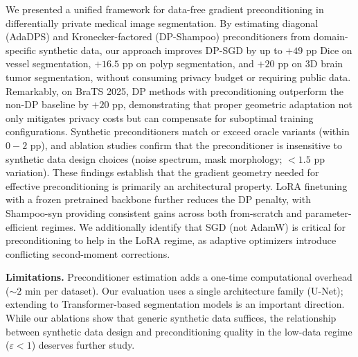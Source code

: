 \documentclass[runningheads]{llncs}
\begin{document}
We presented a unified framework for data-free gradient preconditioning in differentially private medical image segmentation. By estimating diagonal (AdaDPS) and Kronecker-factored (DP-Shampoo) preconditioners from domain-specific synthetic data, our approach improves DP-SGD by up to $+49$ pp Dice on vessel segmentation, $+16.5$ pp on polyp segmentation, and $+20$ pp on 3D brain tumor segmentation, without consuming privacy budget or requiring public data. Remarkably, on BraTS 2025, DP methods with preconditioning outperform the non-DP baseline by $+20$ pp, demonstrating that proper geometric adaptation not only mitigates privacy costs but can compensate for suboptimal training configurations. Synthetic preconditioners match or exceed oracle variants (within $0{-}2$ pp), and ablation studies confirm that the preconditioner is insensitive to synthetic data design choices (noise spectrum, mask morphology; $<1.5$ pp variation). These findings establish that the gradient geometry needed for effective preconditioning is primarily an architectural property. LoRA finetuning with a frozen pretrained backbone further reduces the DP penalty, with Shampoo-syn providing consistent gains across both from-scratch and parameter-efficient regimes. We additionally identify that SGD (not AdamW) is critical for preconditioning to help in the LoRA regime, as adaptive optimizers introduce conflicting second-moment corrections.

\textbf{Limitations.} Preconditioner estimation adds a one-time computational overhead (${\sim}2$ min per dataset). Our evaluation uses a single architecture family (U-Net); extending to Transformer-based segmentation models is an important direction. While our ablations show that generic synthetic data suffices, the relationship between synthetic data design and preconditioning quality in the low-data regime ($\varepsilon{<}1$) deserves further study.



\end{document}
